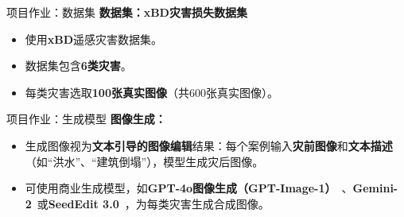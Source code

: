 \begin{refsection}
  \begin{frame}{项目作业：数据集}
    \textbf{数据集：xBD灾害损失数据集}
    \begin{itemize}
      \item 使用\textbf{xBD}遥感灾害数据集。
      \item 数据集包含\textbf{6类灾害}。
      \item 每类灾害选取\textbf{100张真实图像}（共600张真实图像）。
    \end{itemize}
    \bottomleftrefs
  \end{frame}
  \end{refsection}
  
  \begin{refsection}
    \begin{frame}{项目作业：生成模型}
      \textbf{图像生成：}
      \begin{itemize}
        \item 生成图像视为\textbf{文本引导的图像编辑}结果：每个案例输入\textbf{灾前图像}和\textbf{文本描述}（如“洪水”、“建筑倒塌”），模型生成灾后图像。
        \item 可使用商业生成模型，如\textbf{GPT-4o图像生成（GPT-Image-1）}~\parencite{gptimage1}、\textbf{Gemini-2}~\parencite{gemini2}或\textbf{SeedEdit 3.0}~\parencite{wang2025seedit}，为每类灾害生成合成图像。
      \end{itemize}
      \bottomleftrefs
    \end{frame}
  \end{refsection}
  
